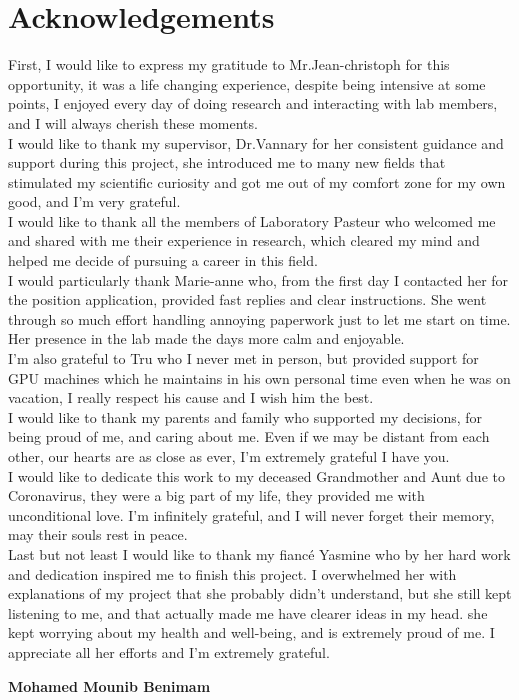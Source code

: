 \documentclass[main.tex]{subfiles}
\begin{document}
\chapter*{Acknowledgements}

First, I would like to express my gratitude to Mr.Jean-christoph for this opportunity, it was a life changing experience, despite being intensive at some points, I enjoyed every day of doing research and interacting with lab members, and I will always cherish these moments.\\

I would like to thank my supervisor, Dr.Vannary for her consistent guidance and support  during this project, she introduced me to many new fields that stimulated my scientific curiosity and got me out of my comfort zone for my own good, and I'm very grateful.\\

I would like to thank all the members of Laboratory Pasteur who welcomed me and shared with me their experience in research, which cleared my mind and helped me decide of pursuing a career in this field.\\

I would particularly thank Marie-anne who, from the first day I contacted her for the position application, provided fast replies and clear instructions. She went through so much effort handling annoying paperwork just to let me start on time. Her presence in the lab made the days more calm and enjoyable.\\

I'm also grateful to Tru who I never met in person, but provided support for GPU machines which he maintains in his own personal time even when he was on vacation, I really respect his cause and I wish him the best.\\

I would like to thank my parents and family who supported my decisions, for being proud of me, and caring about me. Even if we may be distant from each other, our hearts are as close as ever, I'm extremely grateful I have you.\\

I would like to dedicate this work to my deceased Grandmother and Aunt due to Coronavirus, they were a big part of my life, they provided me with unconditional love. I'm infinitely grateful, and I will never forget their memory, may their souls rest in peace.\\

Last but not least I would like to thank my fiancé Yasmine who by her hard work and dedication inspired me to finish this project. I overwhelmed her with explanations of my project that she probably didn't understand, but she still kept listening to me, and that actually made me have clearer ideas in my head. she kept worrying about my health and well-being, and is extremely proud of me. I appreciate all her efforts and I'm extremely grateful.\\


\begin{flushright}
\textbf{Mohamed Mounib Benimam}
\end{flushright}
\end{document}
